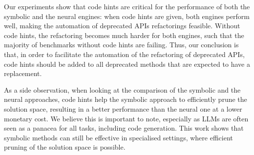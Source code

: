 \documentclass[sigconf,review,anonymous]{acmart}
\begin{document}
Our experiments show that code hints are critical for the performance of both the symbolic and the neural engines: when code hints are given, both engines perform well, making the automation of deprecated APIs refactorings feasible. Without code hints, the refactoring becomes much harder for both engines, such that the majority of benchmarks without code hints are failing. Thus, our conclusion is that, in order to facilitate
the automation of the refactoring of deprecated APIs, code hints should be added to all deprecated methods that are expected to have a replacement.

As a side observation, when looking at the comparison of the symbolic and the neural approaches, code hints help the symbolic approach to efficiently prune the solution space, resulting in a better performance than the neural one at a lower monetary cost. We believe this is important to note, especially as LLMs are often seen as a panacea for all tasks, including code generation. This work shows that symbolic methods can still be effective in specialised settings, where efficient pruning of the solution space is possible. 





\end{document}
